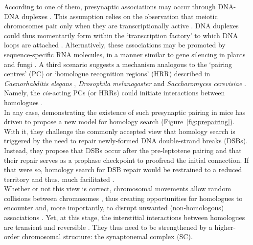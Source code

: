 According to one of them, presynaptic associations may occur through DNA-DNA duplexes \citep{danilowicz2009single}. 
This assumption relies on the observation that meiotic chromosomes pair only when they are transcriptionally active \citep{cook1997transcriptional}. 
DNA duplexes could thus momentarily form within the ‘transcription factory’ to which DNA loops are attached \citep{xu2008similar}.
Alternatively, these associations may be promoted by sequence-specific RNA molecules, in a manner similar to gene silencing in plants and fungi \citep[cited in \citealp{zickler2006early}]{bender2004dna}.
A third scenario suggests a mechanism analogous to the ‘pairing centres’ (PC) or ‘homologue recognition regions’ (HRR) described in \textit{Caenorhabditis elegans} \citep{villeneuve1994cis,macqueen2005chromosome}, \textit{Drosophila melanogaster} \citep{mckee1996license} and \textit{Saccharomyces cerevisiae} \citep{kemp2004role}.
Namely, the \textit{cis}-acting PCs (or HRRs) could initiate interactions between homologues \citep{gerton2005homologous}.\\


In any case, demonstrating the existence of such presynaptic pairing in mice has driven \citet{boateng2013homologous} to propose a new model for homology search (Figure~\ref{fig:prepairing}).
With it, they challenge the commonly accepted view that homology search is triggered by the need to repair newly-formed DNA double-strand breaks (DSBs).
Instead, they propose that DSBs occur after the pre-leptotene pairing and that their repair serves as a prophase checkpoint to proofread the initial connection.
If that were so, homology search for DSB repair would be restrained to a reduced territory and thus, much facilitated \citep{barzel2008finding,mirny2011fractal}.\\

Whether or not this view is correct, chromosomal movements allow random collisions between chromosomes \citep{fung1998homologous}, thus creating opportunities for homologues to encounter and, more importantly, to disrupt unwanted (non-homologous) associations \citep{koszul2009dynamic}.
Yet, at this stage, the interstitial interactions between homologues are transient and reversible \citep{boateng2013homologous}.
They thus need to be strengthened by a higher-order chromosomal structure: the synaptonemal complex (SC).



